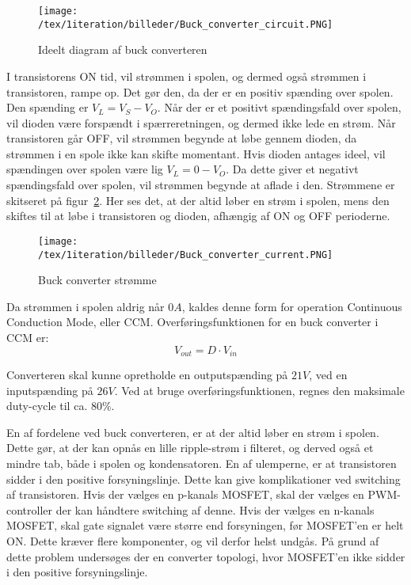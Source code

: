 \begin{figure}[H]
	\center
	\texttt{[image: /tex/1iteration/billeder/Buck\_converter\_circuit.PNG]}
	\caption{Ideelt diagram af buck converteren
		\cite{buck-converter}}
	\label{fig:buck_converter_circuit}
\end{figure}


I transistorens ON tid, vil strømmen i spolen, og dermed også strømmen i transistoren, rampe op. Det gør den, da der er en positiv spænding over spolen. Den spænding er $V_L=V_S-V_O$. Når der er et positivt spændingsfald over spolen, vil dioden være forspændt i spærreretningen, og dermed ikke lede en strøm. Når transistoren går OFF, vil strømmen begynde at løbe gennem dioden, da strømmen i en spole ikke kan skifte momentant. Hvis dioden antages ideel, vil spændingen over spolen være lig $V_L=0-V_O$. Da dette giver et negativt spændingsfald over spolen, vil strømmen begynde at aflade i den. Strømmene er skitseret på figur~\ref{fig:buck_converter_current}. Her ses det, at der altid løber en strøm i spolen, mens den skiftes til at løbe i transistoren og dioden, afhængig af ON og OFF perioderne. 


\begin{figure}[H]
	\center
	\texttt{[image: /tex/1iteration/billeder/Buck\_converter\_current.PNG]}
	\caption{Buck converter strømme
		\cite{buck-converter}}
	\label{fig:buck_converter_current}
\end{figure}


Da strømmen i spolen aldrig når $0A$, kaldes denne form for operation Continuous Conduction Mode, eller CCM. Overføringsfunktionen for en buck converter i CCM er\cite{SMPS-topologies2}:
\begin{equation} \label{buck_converter_overforinsfunktion}
V_{out} = D\cdot V_{in}
\end{equation}

Converteren skal kunne opretholde en outputspænding på $21V$, ved en inputspænding på $26V$. Ved at bruge overføringsfunktionen, regnes den maksimale duty-cycle til ca. $80\percent$. 

En af fordelene ved buck converteren, er at der altid løber en strøm i spolen. Dette gør, at der kan opnås en lille ripple-strøm i filteret, og derved også et mindre tab, både i spolen og kondensatoren. 
En af ulemperne, er at transistoren sidder i den positive forsyningslinje. Dette kan give komplikationer ved switching af transistoren. Hvis der vælges en p-kanals MOSFET, skal der vælges en PWM-controller der kan håndtere switching af denne. Hvis der vælges en n-kanals MOSFET, skal gate signalet være større end forsyningen, før MOSFET'en er helt ON. Dette kræver flere komponenter, og vil derfor helst undgås. På grund af dette problem undersøges der en converter topologi, hvor MOSFET'en ikke sidder i den positive forsyningslinje.


